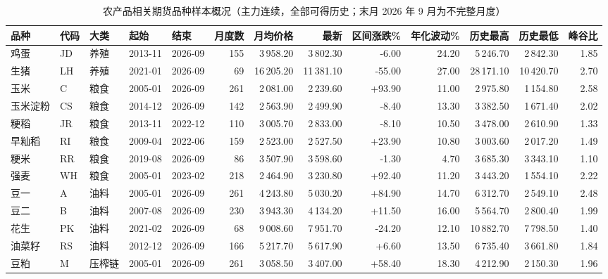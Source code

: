 \begin{table}[htbp]
\centering
\scriptsize
\caption{农产品相关期货品种样本概况（主力连续，全部可得历史；末月 2026 年 9 月为不完整月度）}
\label{tab:fut-summary}
\begin{adjustbox}{max width=\textwidth}
\begin{tabular}{@{}lllllrrrrrrrr@{}}
\toprule
品种 & 代码 & 大类 & 起始 & 结束 & 月度数 & 月均价格 & 最新 & 区间涨跌\% & 年化波动\% & 历史最高 & 历史最低 & 峰谷比 \\
\midrule
鸡蛋 & JD & 养殖 & 2013-11 & 2026-09 & 155 & 3\,958.20 & 3\,802.30 & -6.00 & 24.20 & 5\,246.70 & 2\,842.30 & 1.85 \\
生猪 & LH & 养殖 & 2021-01 & 2026-09 & 69 & 16\,205.20 & 11\,381.10 & -55.00 & 27.00 & 28\,171.10 & 10\,420.70 & 2.70 \\
玉米 & C & 粮食 & 2005-01 & 2026-09 & 261 & 2\,081.00 & 2\,239.60 & +93.90 & 11.00 & 2\,975.80 & 1\,154.80 & 2.58 \\
玉米淀粉 & CS & 粮食 & 2014-12 & 2026-09 & 142 & 2\,563.90 & 2\,499.90 & -8.40 & 13.30 & 3\,382.50 & 1\,671.40 & 2.02 \\
粳稻 & JR & 粮食 & 2013-11 & 2022-12 & 110 & 3\,005.70 & 2\,833.00 & -8.10 & 10.50 & 3\,478.00 & 2\,610.90 & 1.33 \\
早籼稻 & RI & 粮食 & 2009-04 & 2022-06 & 159 & 2\,523.00 & 2\,527.50 & +23.90 & 10.80 & 3\,003.60 & 2\,017.20 & 1.49 \\
粳米 & RR & 粮食 & 2019-08 & 2026-09 & 86 & 3\,507.90 & 3\,598.60 & -1.30 & 4.70 & 3\,685.30 & 3\,343.10 & 1.10 \\
强麦 & WH & 粮食 & 2005-01 & 2023-02 & 218 & 2\,464.90 & 3\,230.80 & +92.40 & 11.20 & 3\,443.20 & 1\,554.10 & 2.22 \\
豆一 & A & 油料 & 2005-01 & 2026-09 & 261 & 4\,243.80 & 5\,030.20 & +84.90 & 14.70 & 6\,312.70 & 2\,549.10 & 2.48 \\
豆二 & B & 油料 & 2007-08 & 2026-09 & 230 & 3\,943.30 & 4\,134.20 & +11.50 & 16.00 & 5\,564.70 & 2\,800.40 & 1.99 \\
花生 & PK & 油料 & 2021-02 & 2026-09 & 68 & 9\,008.60 & 7\,951.70 & -24.20 & 12.10 & 10\,882.70 & 7\,798.50 & 1.40 \\
油菜籽 & RS & 油料 & 2012-12 & 2026-09 & 166 & 5\,217.70 & 5\,617.90 & +6.60 & 13.50 & 6\,735.40 & 3\,661.80 & 1.84 \\
豆粕 & M & 压榨链 & 2005-01 & 2026-09 & 261 & 3\,058.50 & 3\,407.00 & +58.40 & 18.30 & 4\,212.90 & 2\,150.30 & 1.96 \\

\end{tabular}
\end{adjustbox}
\end{table}
